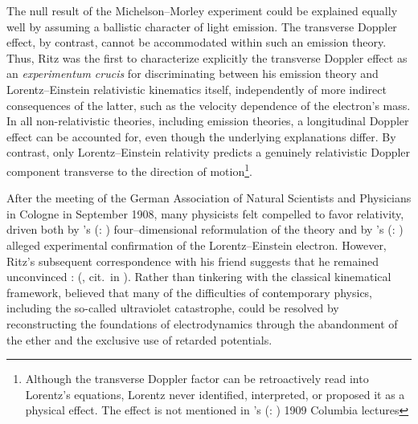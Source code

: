 \documentclass[pdflatex,sn-basic]{sn-jnl}
\newcommand{\tDe}{transverse Doppler effect\xspace}
\newcommand{\tm}{; translation modified}
\renewcommand{\citets}[2][]{\citeauthor{#2}'s (\citeyear{#2}\if\relax\detokenize{#1}\relax\else: #1\fi)}
\begin{document}
%
The null result of the Michelson--Morley experiment could be explained equally well by assuming a ballistic character of light emission. The \tDe, by contrast, cannot be accommodated within such an emission theory. Thus, Ritz was the first to characterize explicitly the transverse Doppler effect as an \textit{experimentum crucis} for discriminating between his emission theory and Lorentz--Einstein relativistic kinematics itself, independently of more indirect consequences of the latter, such as the velocity dependence of the electron’s mass. In all non-relativistic theories, including emission theories, a longitudinal Doppler effect can be accounted for, even though the underlying explanations differ. By contrast, only Lorentz--Einstein relativity predicts a genuinely relativistic Doppler component transverse to the direction of motion\footnote{Although the transverse Doppler factor can be retroactively read into Lorentz’s equations, Lorentz never identified, interpreted, or proposed it as a physical effect. The effect is not mentioned in \citets{Lorentz1916} 1909 Columbia lectures}.

After the meeting of the German Association of Natural Scientists and Physicians in Cologne in September 1908, many physicists felt compelled to favor relativity, driven both by \citets{Minkowski1909} four--dimensional reformulation of the theory and by \citets{Bucherer1908} alleged experimental confirmation of the Lorentz--Einstein electron. However, Ritz’s subsequent correspondence with his friend \Ehr suggests that he remained unconvinced \citep[268--271]{Staley2008}:  (, cit.\ in \cite[270--271\tm]{Staley2008}). Rather than tinkering with the classical kinematical framework, \citet{Ritz1908} believed that many of the difficulties of contemporary physics, including the so-called ultraviolet catastrophe, could be resolved by reconstructing the foundations of electrodynamics through the abandonment of the ether and the exclusive use of retarded potentials.

\end{document}

